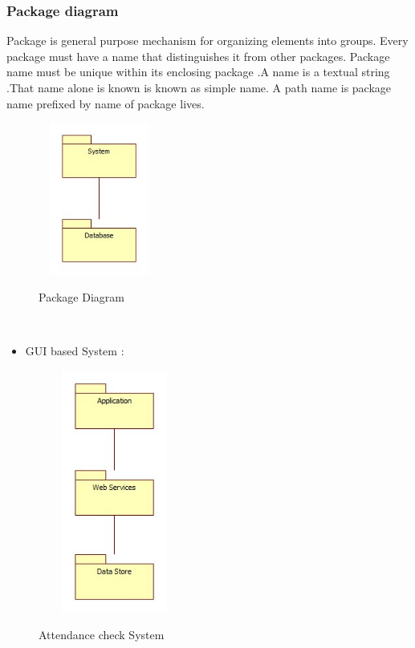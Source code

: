 \subsubsection{Package diagram}
\hspace*{0.7in} Package is general purpose mechanism for organizing elements into groups. Every package must have a name that distinguishes it from other packages. Package name must be unique within its enclosing package .A name is a textual string .That name alone is known is known as simple name. A path name is package name prefixed by name of package lives.
\\
\begin{figure}[h]
\centering
  \includegraphics[width=4cm,height=5cm]{Fig17.jpg}\\
  \caption{Package Diagram}
  \label{Package Diagram}
\end{figure}
\\
\newpage
\begin{itemize}
  \item GUI based  System :
\end{itemize}
\begin{figure}[h]
\centering
  \includegraphics[width=5cm,height=8cm]{Fig18.jpg}\\
  \caption{Attendance check  System}
  \label{Attendance check  System}
\end{figure}

